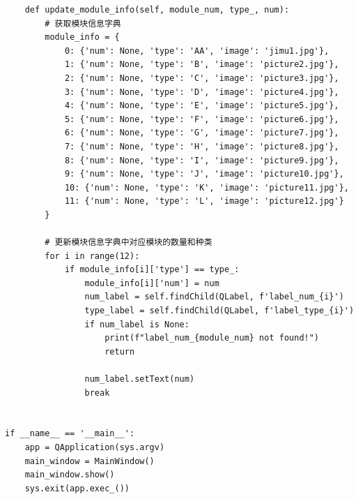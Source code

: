 \documentclass{article}
\begin{document}
\begin{lstlisting}
    def update_module_info(self, module_num, type_, num):
        # 获取模块信息字典
        module_info = {
            0: {'num': None, 'type': 'AA', 'image': 'jimu1.jpg'},
            1: {'num': None, 'type': 'B', 'image': 'picture2.jpg'},
            2: {'num': None, 'type': 'C', 'image': 'picture3.jpg'},
            3: {'num': None, 'type': 'D', 'image': 'picture4.jpg'},
            4: {'num': None, 'type': 'E', 'image': 'picture5.jpg'},
            5: {'num': None, 'type': 'F', 'image': 'picture6.jpg'},
            6: {'num': None, 'type': 'G', 'image': 'picture7.jpg'},
            7: {'num': None, 'type': 'H', 'image': 'picture8.jpg'},
            8: {'num': None, 'type': 'I', 'image': 'picture9.jpg'},
            9: {'num': None, 'type': 'J', 'image': 'picture10.jpg'},
            10: {'num': None, 'type': 'K', 'image': 'picture11.jpg'},
            11: {'num': None, 'type': 'L', 'image': 'picture12.jpg'}
        }

        # 更新模块信息字典中对应模块的数量和种类
        for i in range(12):
            if module_info[i]['type'] == type_:
                module_info[i]['num'] = num
                num_label = self.findChild(QLabel, f'label_num_{i}')
                type_label = self.findChild(QLabel, f'label_type_{i}')
                if num_label is None:
                    print(f"label_num_{module_num} not found!")
                    return

                num_label.setText(num)
                break


if __name__ == '__main__':
    app = QApplication(sys.argv)
    main_window = MainWindow()
    main_window.show()
    sys.exit(app.exec_())  
\end{lstlisting}
\end{document}
